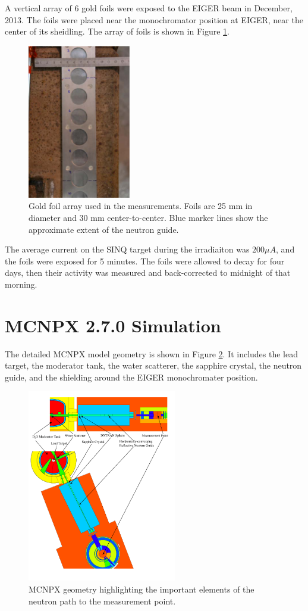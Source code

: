 \documentclass[a4paper,
              ]{jacow}
\begin{document}
A vertical array of 6 gold foils were exposed to the EIGER beam in December, 2013.  The foils were placed near the monochromator position at EIGER, near the center of its sheidling.  The array of foils is shown in Figure \ref{foils}.  

\begin{figure}[!htb]
   \centering
   \includegraphics*[width=45mm]{graphics/foils.eps}
   \caption{Gold foil array used in the measurements.  Foils are 25 mm in diameter and 30 mm center-to-center.  Blue marker lines show the approximate extent of the neutron guide.}
   \label{foils}
\end{figure}

The average current on the SINQ target during the irradiaiton was $200 \mu A$, and the foils were exposed for 5 minutes.  The foils were allowed to decay for four days, then their activity was measured and back-corrected to midnight of that morning.


\section{MCNPX 2.7.0 Simulation}

The detailed MCNPX model geometry is shown in Figure \ref{geom}.  It includes the lead target, the moderator tank, the water scatterer, the sapphire crystal, the neutron guide, and the shielding around the EIGER monochromater position.

\begin{figure}[!htb]
   \centering
   \includegraphics*[width=65mm]{graphics/geom.pdf}
   \caption{MCNPX geometry highlighting the important elements of the neutron path to the measurement point.}
   \label{geom}
\end{figure}
\end{document}
